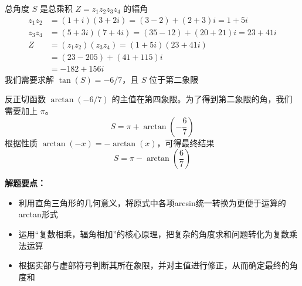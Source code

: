\documentclass{ctexart}
\newcommand{\important}[1]{\textcolor{crimsonred}{\textbf{#1}}}
\begin{document}
\begin{analysisbox}
\begin{center}
\end{center}
总角度 $S$ 是总乘积 $Z = z_1 z_2 z_3 z_4$ 的辐角
\begin{align*}
    z_1 z_2 &= (1+i)(3+2i) = (3-2) + (2+3)i = 1+5i \\
    z_3 z_4 &= (5+3i)(7+4i) = (35-12) + (20+21)i = 23+41i \\
    Z &= (z_1 z_2)(z_3 z_4) = (1+5i)(23+41i) \\
      &= (23-205) + (41+115)i \\
      &= -182 + 156i
\end{align*}
我们需要求解 $\tan(S) = -6/7$，且 $S$ 位于第二象限

反正切函数 $\arctan(-6/7)$ 的主值在第四象限。为了得到第二象限的角，我们需要加上 $\pi$。
$$ S = \pi + \arctan\left(-\frac{6}{7}\right) $$
根据性质 $\arctan(-x) = -\arctan(x)$，可得最终结果
\[ \boxed{S = \pi - \arctan\left(\frac{6}{7}\right)} \]
\end{analysisbox}

\begin{notebox}
\important{解题要点：}
\begin{itemize}[leftmargin=15pt, itemsep=5pt]
    \item 利用直角三角形的几何意义，将原式中各项arcsin统一转换为更便于运算的arctan形式
    \item 运用“复数相乘，辐角相加”的核心原理，把复杂的角度求和问题转化为复数乘法运算
    \item 根据实部与虚部符号判断其所在象限，并对主值进行修正，从而确定最终的角度和
\end{itemize}
\end{notebox}
\end{document}
